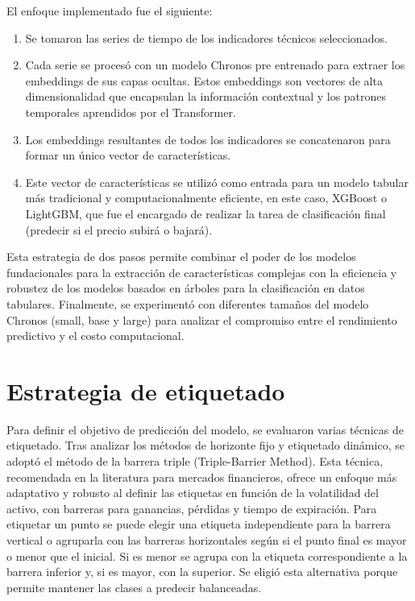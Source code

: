 El enfoque implementado fue el siguiente:
\begin{enumerate}
    \item Se tomaron las series de tiempo de los indicadores técnicos seleccionados.
    \item Cada serie se procesó con un modelo Chronos pre entrenado para extraer los embeddings de sus capas ocultas. Estos embeddings son vectores de alta dimensionalidad que encapsulan la información contextual y los patrones temporales aprendidos por el Transformer.
    \item Los embeddings resultantes de todos los indicadores se concatenaron para formar un único vector de características.
    \item Este vector de características se utilizó como entrada para un modelo tabular más tradicional y computacionalmente eficiente, en este caso, XGBoost o LightGBM, que fue el encargado de realizar la tarea de clasificación final (predecir si el precio subirá o bajará).
\end{enumerate}

Esta estrategia de dos pasos permite combinar el poder de los modelos fundacionales para la extracción de características complejas con la eficiencia y robustez de los modelos basados en árboles para la clasificación en datos tabulares. Finalmente, se experimentó con diferentes tamaños del modelo Chronos (small, base y large) para analizar el compromiso entre el rendimiento predictivo y el costo computacional.

\section{Estrategia de etiquetado}

Para definir el objetivo de predicción del modelo, se evaluaron varias técnicas de etiquetado. Tras analizar los métodos de horizonte fijo y etiquetado dinámico, se adoptó el método de la barrera triple (Triple-Barrier Method)\cite{LoP:2018}. Esta técnica, recomendada en la literatura para mercados financieros, ofrece un enfoque más adaptativo y robusto al definir las etiquetas en función de la volatilidad del activo, con barreras para ganancias, pérdidas y tiempo de expiración.
Para etiquetar un punto se puede elegir una etiqueta independiente para la barrera vertical o agruparla con las barreras horizontales según si el punto final es mayor o menor que el inicial. Si es menor se agrupa con la etiqueta correspondiente a la barrera inferior y, si es mayor, con la superior. Se eligió esta alternativa porque permite mantener las clases a predecir balanceadas.

